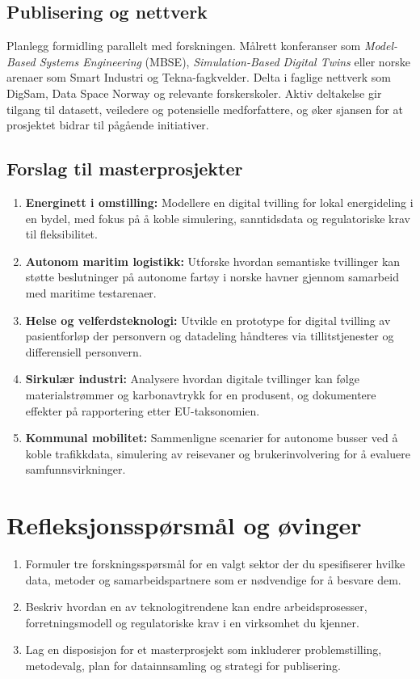 \subsection{Publisering og nettverk}
Planlegg formidling parallelt med forskningen. Målrett konferanser som \emph{Model-Based Systems Engineering} (MBSE), \emph{Simulation-Based Digital Twins} eller norske arenaer som Smart Industri og Tekna-fagkvelder. Delta i faglige nettverk som DigSam, Data Space Norway og relevante forskerskoler. Aktiv deltakelse gir tilgang til datasett, veiledere og potensielle medforfattere, og øker sjansen for at prosjektet bidrar til pågående initiativer.

\subsection{Forslag til masterprosjekter}
\begin{enumerate}
    \item \textbf{Energinett i omstilling:} Modellere en digital tvilling for lokal energideling i en bydel, med fokus på å koble simulering, sanntidsdata og regulatoriske krav til fleksibilitet.
    \item \textbf{Autonom maritim logistikk:} Utforske hvordan semantiske tvillinger kan støtte beslutninger på autonome fartøy i norske havner gjennom samarbeid med maritime testarenaer.
    \item \textbf{Helse og velferdsteknologi:} Utvikle en prototype for digital tvilling av pasientforløp der personvern og datadeling håndteres via tillitstjenester og differensiell personvern.
    \item \textbf{Sirkulær industri:} Analysere hvordan digitale tvillinger kan følge materialstrømmer og karbonavtrykk for en produsent, og dokumentere effekter på rapportering etter EU-taksonomien.
    \item \textbf{Kommunal mobilitet:} Sammenligne scenarier for autonome busser ved å koble trafikkdata, simulering av reisevaner og brukerinvolvering for å evaluere samfunnsvirkninger.
\end{enumerate}

\section{Refleksjonsspørsmål og øvinger}
\begin{enumerate}
    \item Formuler tre forskningsspørsmål for en valgt sektor der du spesifiserer hvilke data, metoder og samarbeidspartnere som er nødvendige for å besvare dem.
    \item Beskriv hvordan en av teknologitrendene kan endre arbeidsprosesser, forretningsmodell og regulatoriske krav i en virksomhet du kjenner.
    \item Lag en disposisjon for et masterprosjekt som inkluderer problemstilling, metodevalg, plan for datainnsamling og strategi for publisering.
\end{enumerate}
